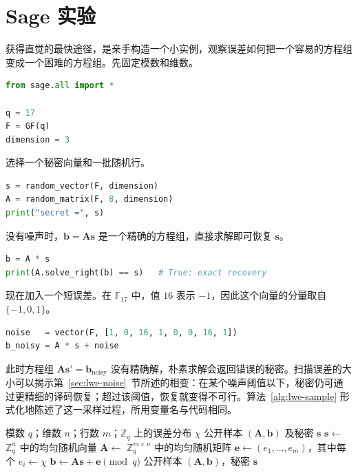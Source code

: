 \section{Sage 实验}

获得直觉的最快途径，是亲手构造一个小实例，观察误差如何把一个容易的方程组变成一个困难的方程组。先固定模数和维数。

\begin{lstlisting}[language=Python]
from sage.all import *

q = 17
F = GF(q)
dimension = 3
\end{lstlisting}

选择一个秘密向量和一批随机行。

\begin{lstlisting}[language=Python]
s = random_vector(F, dimension)
A = random_matrix(F, 8, dimension)
print("secret =", s)
\end{lstlisting}

没有噪声时，$\mathbf{b}=\mathbf{A}\mathbf{s}$ 是一个精确的方程组，直接求解即可恢复 $\mathbf{s}$。

\begin{lstlisting}[language=Python]
b = A * s
print(A.solve_right(b) == s)   # True: exact recovery
\end{lstlisting}

现在加入一个短误差。在 $\mathbb{F}_{17}$ 中，值 $16$ 表示 $-1$，因此这个向量的分量取自 $\{-1,0,1\}$。

\begin{lstlisting}[language=Python]
noise   = vector(F, [1, 0, 16, 1, 0, 0, 16, 1])
b_noisy = A * s + noise
\end{lstlisting}

此时方程组 $\mathbf{A}\mathbf{s}'=\mathbf{b}_{\text{noisy}}$ 没有精确解，朴素求解会返回错误的秘密。扫描误差的大小可以揭示第~\ref{sec:lwe-noise}~节所述的相变：在某个噪声阈值以下，秘密仍可通过更精细的译码恢复；超过该阈值，恢复就变得不可行。算法~\ref{alg:lwe-sample} 形式化地陈述了这一采样过程，所用变量名与代码相同。

\begin{algorithm}[H]
\caption{生成一个 LWE 样本}
\label{alg:lwe-sample}
\begin{algorithmic}[1]
\Require 模数 $q$；维数 $n$；行数 $m$；$\mathbb{Z}_q$ 上的误差分布 $\chi$
\Ensure 公开样本 $(\mathbf{A},\mathbf{b})$ 及秘密 $\mathbf{s}$
\State $\mathbf{s} \gets$ $\mathbb{Z}_q^{n}$ 中的均匀随机向量 
\State $\mathbf{A} \gets$ $\mathbb{Z}_q^{m \times n}$ 中的均匀随机矩阵 
\State $\mathbf{e} \gets (e_1,\dots,e_m)$，其中每个 $e_i \gets \chi$ 
\State $\mathbf{b} \gets \mathbf{A}\mathbf{s} + \mathbf{e} \pmod q$ 
\State \Return 公开样本 $(\mathbf{A},\mathbf{b})$，秘密 $\mathbf{s}$
\end{algorithmic}
\end{algorithm}

